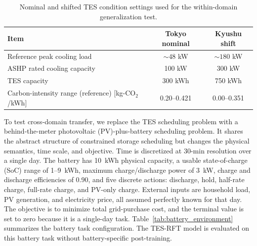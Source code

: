 \documentclass[11pt]{article}
\begin{document}
\begin{table}[t]
\centering
\caption{Nominal and shifted TES condition settings used for the within-domain generalization test.}
\label{tab:tes_shift_settings}
\small
\begin{tabular}{lcc}
\toprule
Item & Tokyo nominal & Kyushu shift \\
\midrule
Reference peak cooling load & $\sim 48$ kW & $\sim 180$ kW \\
ASHP rated cooling capacity & 100 kW & 300 kW \\
TES capacity & 300 kWh & 750 kWh \\
Carbon-intensity range (reference) [kg-CO$_2$/kWh] & 0.20--0.421 & 0.00--0.351 \\
\bottomrule
\end{tabular}
\end{table}

To test cross-domain transfer, we replace the TES scheduling problem with a behind-the-meter photovoltaic (PV)-plus-battery scheduling problem. It shares the abstract structure of constrained storage scheduling but changes the physical semantics, time scale, and objective. Time is discretized at 30-min resolution over a single day. The battery has 10~kWh physical capacity, a usable state-of-charge (SoC) range of 1--9~kWh, maximum charge/discharge power of 3~kW, charge and discharge efficiencies of 0.90, and five discrete actions: discharge, hold, half-rate charge, full-rate charge, and PV-only charge. External inputs are household load, PV generation, and electricity price, all assumed perfectly known for that day. The objective is to minimize total grid-purchase cost, and the terminal value is set to zero because it is a single-day task. Table~\ref{tab:battery_environment} summarizes the battery task configuration. The TES-RFT model is evaluated on this battery task without battery-specific post-training.
\end{document}
